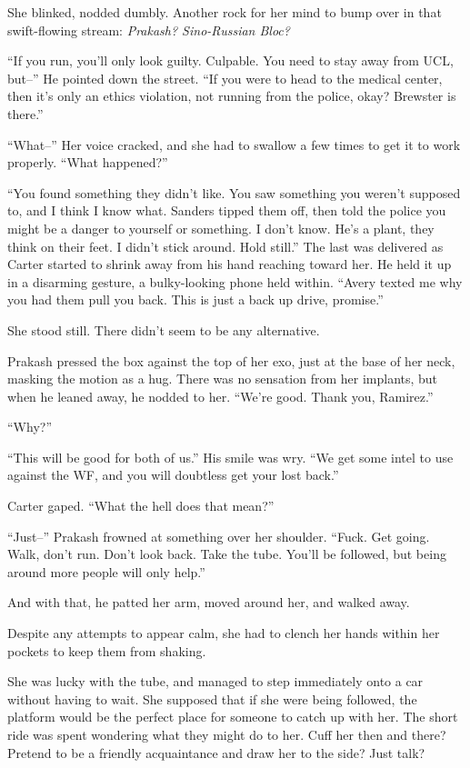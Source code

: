 She blinked, nodded dumbly. Another rock for her mind to bump over in that swift-flowing stream: \emph{Prakash? Sino-Russian Bloc?}

``If you run, you'll only look guilty. Culpable. You need to stay away from UCL, but--'' He pointed down the street. ``If you were to head to the medical center, then it's only an ethics violation, not running from the police, okay? Brewster is there.''

``What--'' Her voice cracked, and she had to swallow a few times to get it to work properly. ``What happened?''

``You found something they didn't like. You saw something you weren't supposed to, and I think I know what. Sanders tipped them off, then told the police you might be a danger to yourself or something. I don't know. He's a plant, they think on their feet. I didn't stick around. Hold still.'' The last was delivered as Carter started to shrink away from his hand reaching toward her. He held it up in a disarming gesture, a bulky-looking phone held within. ``Avery texted me why you had them pull you back. This is just a back up drive, promise.''

She stood still. There didn't seem to be any alternative.

Prakash pressed the box against the top of her exo, just at the base of her neck, masking the motion as a hug. There was no sensation from her implants, but when he leaned away, he nodded to her. ``We're good. Thank you, Ramirez.''

``Why?''

``This will be good for both of us.'' His smile was wry. ``We get some intel to use against the WF, and you will doubtless get your lost back.''

Carter gaped. ``What the hell does that mean?''

``Just--'' Prakash frowned at something over her shoulder. ``Fuck. Get going. Walk, don't run. Don't look back. Take the tube. You'll be followed, but being around more people will only help.''

And with that, he patted her arm, moved around her, and walked away.

Despite any attempts to appear calm, she had to clench her hands within her pockets to keep them from shaking.

She was lucky with the tube, and managed to step immediately onto a car without having to wait. She supposed that if she were being followed, the platform would be the perfect place for someone to catch up with her. The short ride was spent wondering what they might do to her. Cuff her then and there? Pretend to be a friendly acquaintance and draw her to the side? Just talk?

